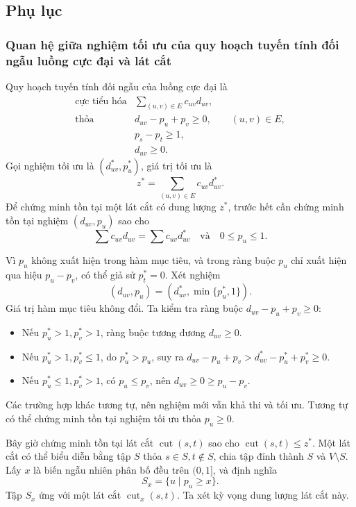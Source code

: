 \documentclass[11pt]{article}
\begin{document}
\subsection*{Phụ lục}

\subsubsection*{Quan hệ giữa nghiệm tối ưu của quy hoạch tuyến tính đối ngẫu luồng cực đại và lát cắt}

Quy hoạch tuyến tính đối ngẫu của luồng cực đại là
\[
\begin{array}{ll}
\text{cực tiểu hóa} & \displaystyle \sum_{(u,v)\in E}c_{uv}d_{uv},\\
\text{thỏa} & d_{uv}-p_u+p_v\ge 0,\qquad (u,v)\in E,\\
& p_s-p_t\ge 1,\\
& d_{uv}\ge 0.
\end{array}
\]
Gọi nghiệm tối ưu là \((d^*_{uv},p^*_u)\), giá trị tối ưu là
\[
  z^*=\sum_{(u,v)\in E}c_{uv}d^*_{uv}.
\]
Để chứng minh tồn tại một lát cắt có dung lượng \(z^*\), trước hết cần chứng
minh tồn tại nghiệm \((d_{uv},p_u)\) sao cho
\[
  \sum c_{uv}d_{uv}=\sum c_{uv}d^*_{uv}
  \quad\text{và}\quad 0\le p_u\le 1.
\]

Vì \(p_u\) không xuất hiện trong hàm mục tiêu, và trong ràng buộc \(p_u\) chỉ
xuất hiện qua hiệu \(p_u-p_v\), có thể giả sử \(p_t^*=0\). Xét nghiệm
\[
  (d_{uv},p_u)=(d^*_{uv},\min\{p^*_u,1\}).
\]
Giá trị hàm mục tiêu không đổi. Ta kiểm tra ràng buộc
\(d_{uv}-p_u+p_v\ge 0\):
\begin{itemize}
  \item Nếu \(p_u^*>1,p_v^*>1\), ràng buộc tương đương \(d_{uv}\ge 0\).
  \item Nếu \(p_u^*>1,p_v^*\le 1\), do \(p_u^*>p_u\), suy ra
  \(d_{uv}-p_u+p_v>d^*_{uv}-p_u^*+p_v^*\ge 0\).
  \item Nếu \(p_u^*\le 1,p_v^*>1\), có \(p_u\le p_v\), nên
  \(d_{uv}\ge 0\ge p_u-p_v\).
\end{itemize}
Các trường hợp khác tương tự, nên nghiệm mới vẫn khả thi và tối ưu. Tương tự
có thể chứng minh tồn tại nghiệm tối ưu thỏa \(p_u\ge 0\).

Bây giờ chứng minh tồn tại lát cắt \(\operatorname{cut}(s,t)\) sao cho
\(\operatorname{cut}(s,t)\le z^*\). Một lát cắt có thể biểu diễn bằng tập
\(S\) thỏa \(s\in S,t\notin S\), chia tập đỉnh thành \(S\) và \(V\setminus S\).
Lấy \(x\) là biến ngẫu nhiên phân bố đều trên \((0,1]\), và định nghĩa
\[
  S_x=\{u\mid p_u\ge x\}.
\]
Tập \(S_x\) ứng với một lát cắt \(\operatorname{cut}_x(s,t)\). Ta xét kỳ vọng
dung lượng lát cắt này.
\end{document}
